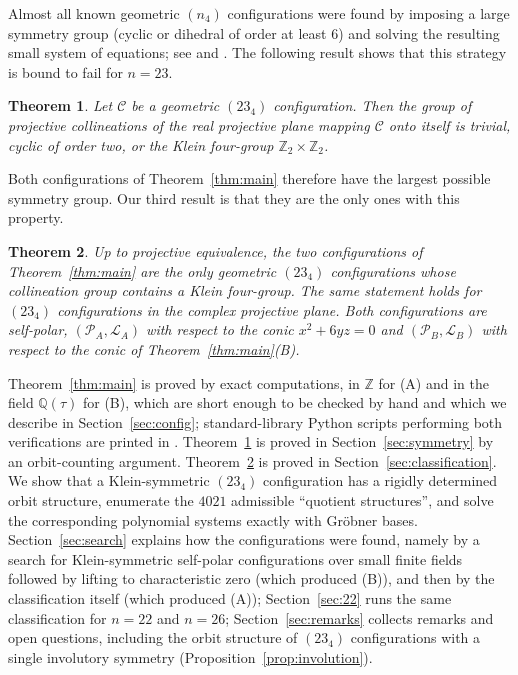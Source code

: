 \documentclass[11pt]{article}
\theoremstyle{plain}
\newtheorem{theorem}{Theorem}
\theoremstyle{definition}
\newcommand{\QQ}{\mathbb{Q}}
\newcommand{\ZZ}{\mathbb{Z}}
\newcommand{\cP}{\mathcal{P}}
\newcommand{\cL}{\mathcal{L}}
\newcommand{\cC}{\mathcal{C}}
\begin{document}
Almost all known geometric $(n_4)$ configurations were found by imposing a large symmetry group (cyclic or dihedral of order at least $6$) and solving the resulting small system of equations; see \cite[Ch.~3]{Gru09} and \cite{BGP24}.  The following result shows that this strategy is bound to fail for $n=23$.

\begin{theorem}\label{thm:symmetry}
Let $\cC$ be a geometric $(23_4)$ configuration.  Then the group of projective collineations of the real projective plane mapping $\cC$ onto itself is trivial, cyclic of order two, or the Klein four-group $\ZZ_2\times\ZZ_2$.
\end{theorem}

Both configurations of Theorem~\ref{thm:main} therefore have the largest possible symmetry group.  Our third result is that they are the only ones with this property.

\begin{theorem}\label{thm:classification}
Up to projective equivalence, the two configurations of Theorem~\ref{thm:main} are the only geometric $(23_4)$ configurations whose collineation group contains a Klein four-group.  The same statement holds for $(23_4)$ configurations in the complex projective plane.  Both configurations are self-polar, $(\cP_A,\cL_A)$ with respect to the conic $x^2+6yz=0$ and $(\cP_B,\cL_B)$ with respect to the conic of Theorem~\ref{thm:main}(B).
\end{theorem}

Theorem~\ref{thm:main} is proved by exact computations, in $\ZZ$ for (A) and in the field $\QQ(\tau)$ for (B), which are short enough to be checked by hand and which we describe in Section~\ref{sec:config}; standard-library Python scripts performing both verifications are printed in \cite{Lu26}.  Theorem~\ref{thm:symmetry} is proved in Section~\ref{sec:symmetry} by an orbit-counting argument.  Theorem~\ref{thm:classification} is proved in Section~\ref{sec:classification}.  We show that a Klein-symmetric $(23_4)$ configuration has a rigidly determined orbit structure, enumerate the $4021$ admissible ``quotient structures'', and solve the corresponding polynomial systems exactly with Gr\"obner bases.  Section~\ref{sec:search} explains how the configurations were found, namely by a search for Klein-symmetric self-polar configurations over small finite fields followed by lifting to characteristic zero (which produced (B)), and then by the classification itself (which produced (A)); Section~\ref{sec:22} runs the same classification for $n=22$ and $n=26$; Section~\ref{sec:remarks} collects remarks and open questions, including the orbit structure of $(23_4)$ configurations with a single involutory symmetry (Proposition~\ref{prop:involution}).
\end{document}
